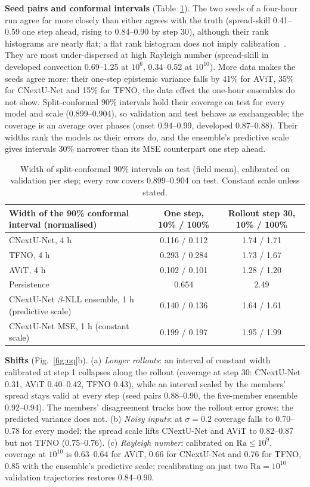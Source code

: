 \documentclass[11pt]{article}
\begin{document}
\textbf{Seed pairs and conformal intervals} (Table~\ref{tab:conformal}). The two seeds of a four-hour run agree far
more closely than either agrees with the truth (spread-skill 0.41--0.59 one step ahead, rising to 0.84--0.90 by step
30), although their rank histograms are nearly flat; a flat rank histogram does not imply
calibration~\cite{hamill2001rank}. They are most under-dispersed at high Rayleigh number (spread-skill in developed
convection 0.69--1.25 at $10^6$, 0.34--0.52 at $10^{10}$). More data makes the seeds agree more: their one-step epistemic variance falls by
41\% for AViT, 35\% for CNextU-Net and 15\% for TFNO, the data effect the one-hour ensembles do not show. Split-conformal
90\% intervals hold their coverage on test for every model and scale (0.899--0.904), so validation and test behave as
exchangeable; the coverage is an average over phases (onset 0.94--0.99, developed 0.87--0.88). Their widths rank the
models as their errors do, and the ensemble's predictive scale gives intervals 30\% narrower than its MSE counterpart
one step ahead.

\begin{table}[tp]
\centering\small
\begin{tabular}{@{}lcc@{}}
\toprule
Width of the 90\% conformal interval (normalised) & One step, 10\% / 100\% & Rollout step 30, 10\% / 100\% \\
\midrule
CNextU-Net, 4 h & 0.116 / 0.112 & 1.74 / 1.71 \\
TFNO, 4 h & 0.293 / 0.284 & 1.73 / 1.67 \\
AViT, 4 h & 0.102 / 0.101 & 1.28 / 1.20 \\
Persistence & 0.654 & 2.49 \\
\midrule
CNextU-Net $\beta$-NLL ensemble, 1 h (predictive scale) & 0.140 / 0.136 & 1.64 / 1.61 \\
CNextU-Net MSE, 1 h (constant scale) & 0.199 / 0.197 & 1.95 / 1.99 \\
\bottomrule
\end{tabular}
\caption{Width of split-conformal 90\% intervals on test (field mean), calibrated on validation per step; every row
covers 0.899--0.904 on test. Constant scale unless stated.}
\label{tab:conformal}
\end{table}

\textbf{Shifts} (Fig.~\ref{fig:uq}b). (a) \emph{Longer rollouts}: an interval of constant width calibrated at step 1
collapses along the rollout (coverage at step 30: CNextU-Net 0.31, AViT 0.40--0.42, TFNO 0.43), while an interval
scaled by the members' spread stays valid at every step (seed pairs 0.88--0.90, the five-member ensemble 0.92--0.94).
The members' disagreement tracks how the rollout error grows; the predicted variance does not. (b) \emph{Noisy inputs}:
at $\sigma=0.2$ coverage falls to 0.70--0.78 for every model; the spread scale lifts CNextU-Net and AViT to 0.82--0.87
but not TFNO (0.75--0.76). (c) \emph{Rayleigh number}: calibrated on $\mathrm{Ra}\le10^9$, coverage at $10^{10}$ is
0.63--0.64 for AViT, 0.66 for CNextU-Net and 0.76 for TFNO, 0.85 with the ensemble's predictive scale; recalibrating
on just two $\mathrm{Ra}=10^{10}$ validation trajectories restores 0.84--0.90.
\end{document}
